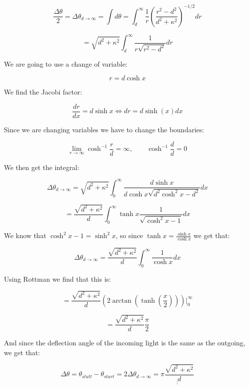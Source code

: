 \documentclass[a4paper,norsk, 10pt]{article}
\begin{document}
$$
\frac{\Delta \theta}{2} = \Delta\theta_{d\rightarrow \infty} = \int d\theta = \int_d^{\infty} \frac{1}{r}\left(\frac{r^2 -d^2}{d^2 +\kappa^2}\right)^{-1/2}dr
$$

$$
= \sqrt{d^2 +\kappa^2}\int_d^{\infty} \frac{1}{r\sqrt{r^2 - d^2}}dr
$$

We are going to use a change of variable:

$$
r = d \cosh x
$$

We find the Jacobi factor:

$$
\frac{dr}{dx} = d\sinh x \Leftrightarrow dr = d\sinh(x) dx
$$

Since we are changing variables we have to change the boundaries:

$$
\lim_{r\rightarrow \infty}\cosh^{-1} \frac{r}{d} = \infty, \qquad \cosh^{-1}\frac{d}{d} = 0
$$

We then get the integral:

$$
\Delta\theta_{d\rightarrow \infty} = \sqrt{d^2 +\kappa^2}\int_0^{\infty} \frac{d\sinh x}{d\cosh x\sqrt{d^2\cosh^2 x - d^2}}dx
$$

$$
= \frac{\sqrt{d^2 +\kappa^2}}{d}\int_0^{\infty} \tanh x \frac{1}{\sqrt{\cosh^2 x - 1}}dx
$$

We know that $\cosh^2 x - 1 = \sinh^2 x$, so since $\tanh x = \frac{\sinh x}{\cosh x}$ we get that:

$$
\Delta\theta_{d\rightarrow \infty} = \frac{\sqrt{d^2 +\kappa^2}}{d}\int_0^{\infty} \frac{1}{\cosh x}dx
$$

Using Rottman we find that this is:

$$
= \frac{\sqrt{d^2 +\kappa^2}}{d} (2 \arctan (\tanh \left(\frac{x}{2}\right))) \bigg|_0^{\infty}
$$

$$
= \frac{\sqrt{d^2 +\kappa^2}}{d} \frac{\pi}{2}
$$

And since the deflection angle of the incoming light is the same as the outgoing, we get that:

$$
\Delta \theta = \theta_{slutt} - \theta_{start} = 2\Delta\theta_{d\rightarrow\infty} = \underline{\underline{\pi \frac{\sqrt{d^2 +\kappa^2}}{d}}}
$$
\end{document}
